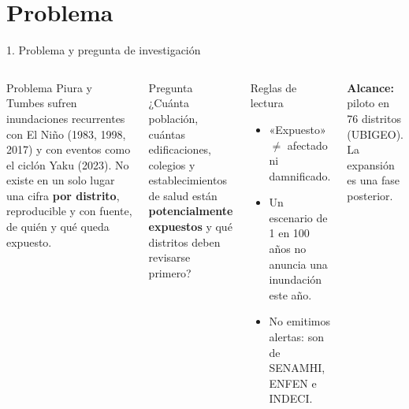 \documentclass[aspectratio=169,11pt]{beamer}
\begin{document}
\section{Problema}
\begin{frame}{1. Problema y pregunta de investigación}
\begin{columns}[T]
\begin{block}{Problema}
Piura y Tumbes sufren inundaciones recurrentes con El Niño (1983, 1998, 2017) y con eventos como el ciclón Yaku (2023). No existe en un solo lugar una cifra \textbf{por distrito}, reproducible y con fuente, de quién y qué queda expuesto.
\end{block}
\begin{block}{Pregunta}
¿Cuánta población, cuántas edificaciones, colegios y establecimientos de salud están \textbf{potencialmente expuestos} y qué distritos deben revisarse primero?
\end{block}
\begin{alertblock}{Reglas de lectura}
\small
\begin{itemize}
\item «Expuesto» $\neq$ afectado ni damnificado.
\item Un escenario de 1 en 100 años no anuncia una inundación este año.
\item No emitimos alertas: son de SENAMHI, ENFEN e INDECI.
\end{itemize}
\end{alertblock}
\small\textbf{Alcance:} piloto en 76 distritos (UBIGEO). La expansión es una fase posterior.
\end{columns}
\end{frame}

\end{document}
